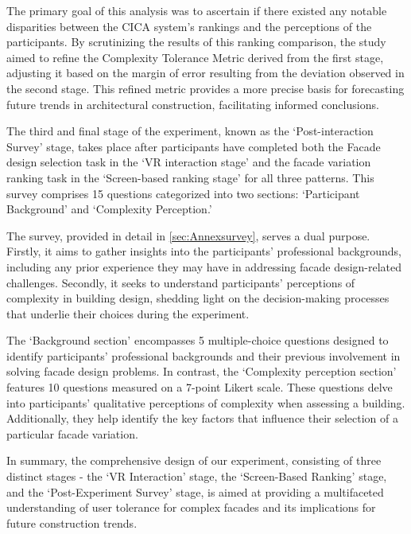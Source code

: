 The primary goal of this analysis was to ascertain if there existed any notable disparities between the CICA system's rankings and the perceptions of the participants.
By scrutinizing the results of this ranking comparison, the study aimed to refine the Complexity Tolerance Metric derived from the first stage, adjusting it based on the margin of error resulting from the deviation observed in the second stage.
This refined metric provides a more precise basis for forecasting future trends in architectural construction, facilitating informed conclusions.


The third and final stage of the experiment, known as the `Post-interaction Survey' stage, takes place after participants have completed both the Facade design selection task in the `VR interaction stage' and the facade variation ranking task in the `Screen-based ranking stage' for all three patterns.
This survey comprises 15 questions categorized into two sections: `Participant Background' and `Complexity Perception.'

The survey, provided in detail in \ref{sec:Annexsurvey}, serves a dual purpose.
Firstly, it aims to gather insights into the participants' professional backgrounds, including any prior experience they may have in addressing facade design-related challenges.
Secondly, it seeks to understand participants' perceptions of complexity in building design, shedding light on the decision-making processes that underlie their choices during the experiment.

The `Background section' encompasses 5 multiple-choice questions designed to identify participants' professional backgrounds and their previous involvement in solving facade design problems.
In contrast, the `Complexity perception section' features 10 questions measured on a 7-point Likert scale.
These questions delve into participants' qualitative perceptions of complexity when assessing a building.
Additionally, they help identify the key factors that influence their selection of a particular facade variation.


In summary, the comprehensive design of our experiment, consisting of three distinct stages - the `VR Interaction' stage, the `Screen-Based Ranking' stage, and the `Post-Experiment Survey' stage, is aimed at providing a multifaceted understanding of user tolerance for complex facades and its implications for future construction trends.

